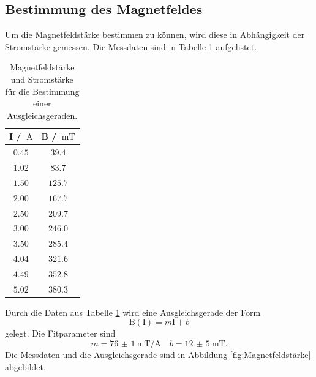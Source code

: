 \subsection{Bestimmung des Magnetfeldes}
Um die Magnetfeldstärke bestimmen zu können, wird diese in Abhängigkeit der Stromstärke gemessen. Die Messdaten
sind in Tabelle \ref{tab:Magnetfeldstärke} aufgelistet.
\begin{table}
    \centering
    \caption{Magnetfeldstärke und Stromstärke für die Bestimmung einer Ausgleichsgeraden.}
    \label{tab:Magnetfeldstärke}
    \begin{tabular}{c c}
        \toprule
        I / $\SI{}{\ampere}$&B / $\SI{}{\milli\tesla}$\\
        \midrule
        $\num{0.45}$&$\num{39.4}$\\
        $\num{1.02}$&$\num{83.7}$\\
        $\num{1.50}$&$\num{125.7}$\\
        $\num{2.00}$&$\num{167.7}$\\
        $\num{2.50}$&$\num{209.7}$\\
        $\num{3.00}$&$\num{246.0}$\\
        $\num{3.50}$&$\num{285.4}$\\
        $\num{4.04}$&$\num{321.6}$\\
        $\num{4.49}$&$\num{352.8}$\\
        $\num{5.02}$&$\num{380.3}$\\
        \bottomrule
    \end{tabular}
\end{table}
Durch die Daten aus Tabelle \ref{tab:Magnetfeldstärke} wird eine Ausgleichsgerade der Form
\begin{equation*}
    \text{B}(\text{I}) = m\text{I} +b
\end{equation*}
gelegt.
Die Fitparameter sind 
\begin{equation*}
    m = \SI{76(1)}{\milli\tesla\per\ampere} \quad b = \SI{12(5)}{\milli\tesla}.
\end{equation*}
Die Messdaten und die Ausgleichsgerade sind in Abbildung \ref{fig:Magnetfeldstärke} abgebildet.
